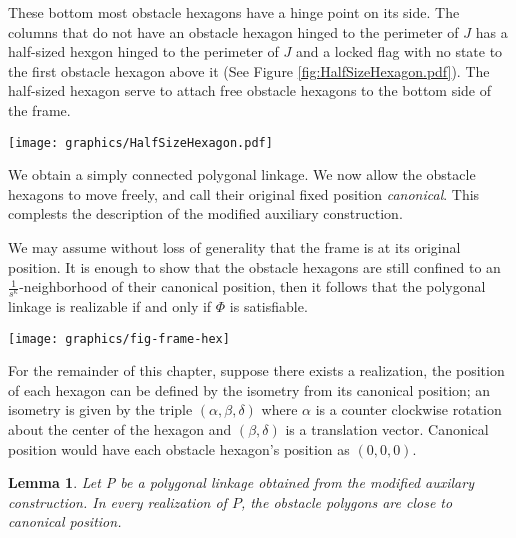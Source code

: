 \documentclass[10pt]{CSUNthesis}
\theoremstyle{plain}%
\newtheorem{lem}{Lemma}
\theoremstyle{definition}
\theoremstyle{remark}
\newcommand{\lr}[1]{\left( #1 \right)}
\begin{document}
\begin{enumerate}
These bottom most obstacle hexagons have a hinge point on its side.
The columns that do not have an obstacle hexagon hinged to the perimeter of $J$ has a half-sized hexgon hinged to the perimeter of $J$ and a locked flag with no state to the first obstacle hexagon above it (See Figure \ref{fig:HalfSizeHexagon.pdf}).  
The half-sized hexagon serve to attach free obstacle hexagons to the bottom side of the frame.

\begin{minipage}{\linewidth}
\begin{center}
\texttt{[image: graphics/HalfSizeHexagon.pdf]}
\label{fig:HalfSizeHexagon.pdf}
\end{center}
\end{minipage}
\end{enumerate}

We obtain a simply connected polygonal linkage. 
We now allow the obstacle hexagons to move freely, and call their original fixed position \emph{canonical}. 
This complests the description of the modified auxiliary construction.  

We may assume without loss of generality that the frame is at its original position. 
It is enough to show that the obstacle hexagons are still confined to an $\frac{1}{s^\kappa}$-neighborhood of their canonical position, then it follows that the polygonal linkage is realizable if and only if $\Phi$ is satisfiable.

\begin{minipage}{\linewidth}
	\begin{center}
	\texttt{[image: graphics/fig-frame-hex]}
	\label{fig:frame}
	\end{center}
\end{minipage}

For the remainder of this chapter, suppose there exists a realization, the position of each hexagon can be defined by the isometry from its canonical position; an isometry is given by the triple $\lr{\alpha, \beta, \delta}$ where $\alpha$ is a counter clockwise rotation about the center of the hexagon and $\lr{\beta,\delta}$ is a translation vector.  
Canonical position would have each obstacle hexagon's position as $(0,0,0)$.
\begin{lem}\label{lem:aux-C}
Let P be a polygonal linkage obtained from the modified auxilary construction.  
In every realization of $P$, the obstacle polygons are close to canonical position.
\end{lem}
\end{document}
